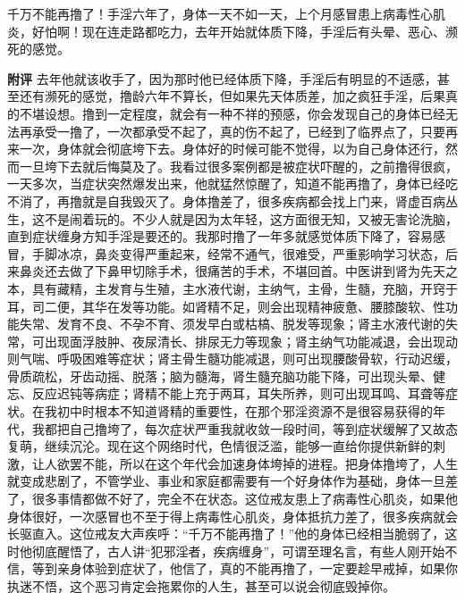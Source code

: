 \begin{case}
    千万不能再撸了！手淫六年了，身体一天不如一天，上个月感冒患上病毒性心肌炎，好怕啊！现在连走路都吃力，去年开始就体质下降，手淫后有头晕、恶心、濒死的感觉。

    \textbf{附评} 去年他就该收手了，因为那时他已经体质下降，手淫后有明显的不适感，甚至还有濒死的感觉，撸龄六年不算长，但如果先天体质差，加之疯狂手淫，后果真的不堪设想。撸到一定程度，就会有一种不祥的预感，你会发现自己的身体已经无法再承受一撸了，一次都承受不起了，真的伤不起了，已经到了临界点了，只要再来一次，身体就会彻底垮下去。身体好的时候可能不觉得，以为自己身体还行，然而一旦垮下去就后悔莫及了。我看过很多案例都是被症状吓醒的，之前撸得很疯，一天多次，当症状突然爆发出来，他就猛然惊醒了，知道不能再撸了，身体已经吃不消了，再撸就是自我毁灭了。身体撸差了，很多疾病都会找上门来，肾虚百病丛生，这不是闹着玩的。不少人就是因为太年轻，这方面很无知，又被无害论洗脑，直到症状缠身方知手淫是要还的。我那时撸了一年多就感觉体质下降了，容易感冒，手脚冰凉，鼻炎变得严重起来，经常不通气，很难受，严重影响学习状态，后来鼻炎还去做了下鼻甲切除手术，很痛苦的手术，不堪回首。中医讲到肾为先天之本，具有藏精，主发育与生殖，主水液代谢，主纳气，主骨，生髓，充脑，开窍于耳，司二便，其华在发等功能。如肾精不足，则会出现精神疲惫、腰膝酸软、性功能失常、发育不良、不孕不育、须发早白或枯槁、脱发等现象；肾主水液代谢的失常，可出现面浮肢肿、夜尿清长、排尿无力等现象；肾主纳气功能减退，会出现动则气喘、呼吸困难等症状；肾主骨生髓功能减退，则可出现腰酸骨软，行动迟缓，骨质疏松，牙齿动摇、脱落；脑为髓海，肾生髓充脑功能下降，可出现头晕、健忘、反应迟钝等病症；肾精不能上充于两耳，耳失所养，则可出现耳鸣、耳聋等症状。在我初中时根本不知道肾精的重要性，在那个邪淫资源不是很容易获得的年代，我都把自己撸垮了，每次症状严重我就收敛一段时间，等到症状缓解了又故态复萌，继续沉沦。现在这个网络时代，色情很泛滥，能够一直给你提供新鲜的刺激，让人欲罢不能，所以在这个年代会加速身体垮掉的进程。把身体撸垮了，人生就变成悲剧了，不管学业、事业和家庭都需要有一个好身体作为基础，身体一旦差了，很多事情都做不好了，完全不在状态。这位戒友患上了病毒性心肌炎，如果他身体很好，一次感冒也不至于得上病毒性心肌炎，身体抵抗力差了，很多疾病就会长驱直入。这位戒友大声疾呼：“千万不能再撸了！”他的身体已经相当脆弱了，这时他彻底醒悟了，古人讲“犯邪淫者，疾病缠身”，可谓至理名言，有些人刚开始不信，等到亲身体验到症状了，他信了，真的不能再撸了，一定要趁早戒掉，如果你执迷不悟，这个恶习肯定会拖累你的人生，甚至可以说会彻底毁掉你。
\end{case}

